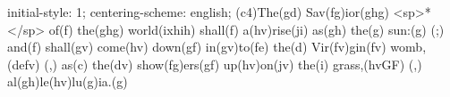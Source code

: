 initial-style: 1;
centering-scheme: english;
(c4)The(gd) Sav(fg)ior(ghg) <sp>*</sp> of(f) the(ghg) world(ixhih) shall(f) a(hv)rise(ji) as(gh) the(g) sun:(g) (;) and(f) shall(gv) come(hv) down(gf) in(gv)to(fe) the(d) Vir(fv)gin(fv) womb,(defv) (,) as(c) the(dv) show(fg)ers(gf) up(hv)on(jv) the(i) grass,(hvGF) (,) al(gh)le(hv)lu(g)ia.(g)
